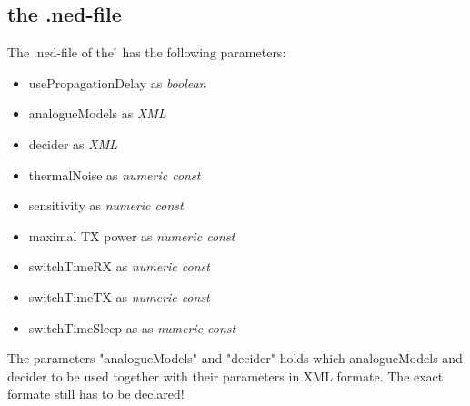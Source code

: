 \subsection{the .ned-file}

The .ned-file of the \h{\bp} has the following parameters:

\begin{itemize}
\item usePropagationDelay as \textit{boolean}
\item analogueModels as \textit{XML}
\item decider as \textit{XML}
\item thermalNoise as \textit{numeric const}
\item sensitivity as \textit{numeric const}
\item maximal TX power as \textit{numeric const}
\item switchTimeRX as \textit{numeric const}
\item switchTimeTX as \textit{numeric const}
\item switchTimeSleep as as \textit{numeric const}
\end{itemize}

The parameters "analogueModels" and "decider" holds which analogueModels and decider to be used together with their parameters in XML formate. The exact formate still has to be declared!






